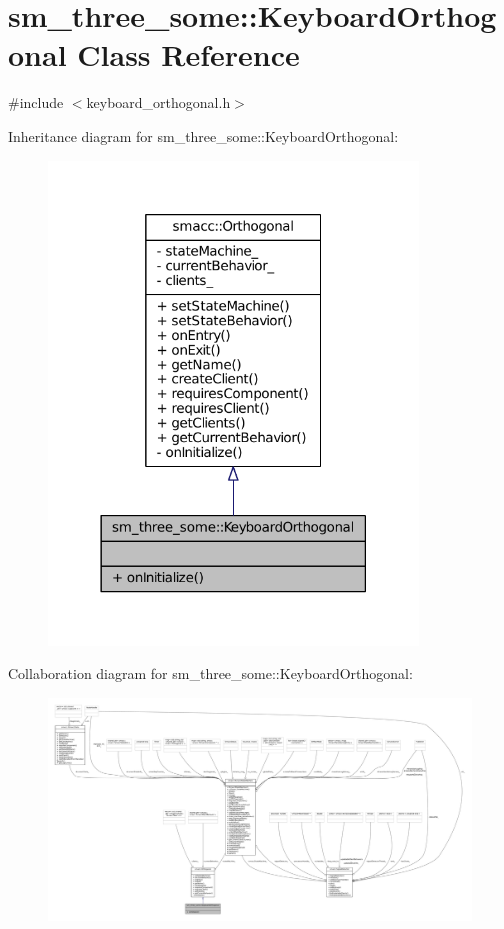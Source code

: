 \hypertarget{classsm__three__some_1_1KeyboardOrthogonal}{}\section{sm\+\_\+three\+\_\+some\+:\+:Keyboard\+Orthogonal Class Reference}
\label{classsm__three__some_1_1KeyboardOrthogonal}


{\ttfamily \#include $<$keyboard\+\_\+orthogonal.\+h$>$}



Inheritance diagram for sm\+\_\+three\+\_\+some\+:\+:Keyboard\+Orthogonal\+:
\nopagebreak
\begin{figure}[H]
\begin{center}
\leavevmode
\includegraphics[width=278pt]{classsm__three__some_1_1KeyboardOrthogonal__inherit__graph}
\end{center}
\end{figure}


Collaboration diagram for sm\+\_\+three\+\_\+some\+:\+:Keyboard\+Orthogonal\+:
\nopagebreak
\begin{figure}[H]
\begin{center}
\leavevmode
\includegraphics[width=350pt]{classsm__three__some_1_1KeyboardOrthogonal__coll__graph}
\end{center}
\end{figure}
